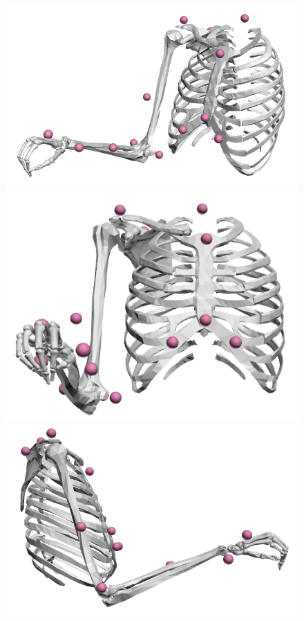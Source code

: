 \begin{figure}[!htb]
    \centering
    \captionsetup{justification=centering}
    \begin{minipage}{0.3\linewidth}
        \centering
        \includegraphics[trim={0 0 0 0}, clip, width=1\linewidth]{img/chapter_5/posture1_3D.png}
    \end{minipage}
    \hfill
    \begin{minipage}{0.3\linewidth}
        \captionsetup{justification=centering}
        \centering
        \includegraphics[trim={0 0 0 0}, clip, width=0.75\linewidth]{img/chapter_5/posture1_coronal.png}
    \end{minipage}
    \hfill
    \begin{minipage}{0.3\linewidth}
        \captionsetup{justification=centering}
        \centering
        \includegraphics[trim={0 0 0 0}, clip, width=0.9\linewidth]{img/chapter_5/posture1_sagittal.png}

\end{minipage}
\end{figure}
